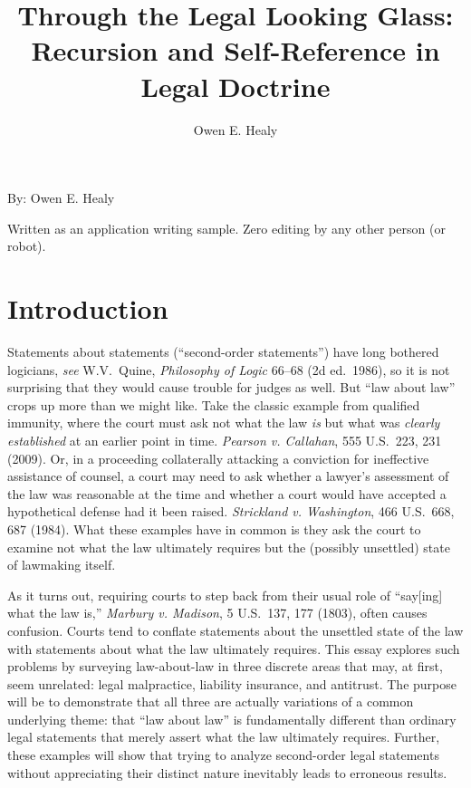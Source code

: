 \documentclass[
  12pt,
  letterpaper,
]{scrartcl}
\title{Through the Legal Looking Glass: Recursion and Self-Reference in Legal Doctrine}
\author{Owen E. Healy}
\begin{document}
\begin{center}\end{center}
  
\vspace{12pt}\noindent\begin{minipage}{4in}
  \setlength{\parskip}{6pt}
  
  \noindent By: Owen E. Healy

  \noindent Written as an application writing sample. Zero editing by any other person (or robot).
\end{minipage}


\vspace{12pt}\section{Introduction}

Statements about statements (``second-order statements'') have long bothered
logicians, \textit{see} W.V.~Quine, \textit{Philosophy of Logic} 66--68 (2d
ed.~1986), so it is not surprising that they would cause trouble for judges as
well. But ``law about law'' crops up more than we might like. Take the classic
example from qualified immunity, where the court must ask not what the
law \textit{is} but what was \textit{clearly
established} at an earlier point in time. \textit{Pearson v. Callahan}, 555 U.S.~223, 231 (2009). Or, in
a proceeding collaterally attacking a conviction for ineffective assistance of
counsel, a court may need to ask whether a lawyer's assessment of the law was reasonable at the time
and whether a court would have accepted a hypothetical defense had it been raised.
\textit{Strickland v. Washington}, 466 U.S.~668, 687 (1984).
What these examples have in common is they ask the court to examine not what the law ultimately requires but the (possibly unsettled) state of lawmaking itself.

As it turns out, requiring courts to step back from their usual role of ``say[ing] what the law is,'' \textit{Marbury v. Madison}, 5 U.S.~137, 177 (1803), often causes confusion. Courts tend to conflate statements about the unsettled state of the law with statements about what the law ultimately requires. This essay explores such problems by surveying law-about-law in three discrete areas
that may, at first, seem unrelated: legal malpractice, liability insurance, and antitrust. The purpose will be to demonstrate that all three
are actually variations of a common underlying theme: that ``law about law'' is fundamentally different than ordinary legal
statements that merely assert what the law ultimately requires. Further,
these examples will show that trying to analyze second-order legal statements without
appreciating their distinct nature inevitably leads to erroneous results.
\end{document}
